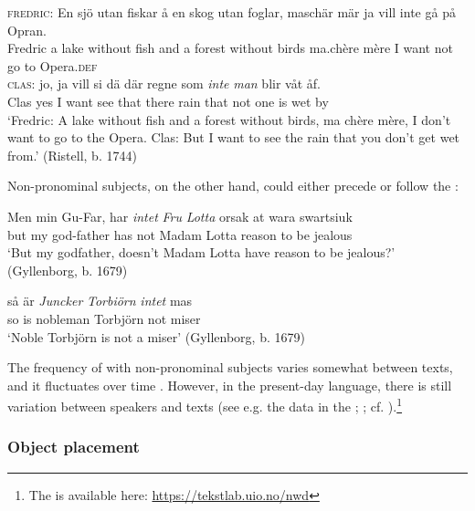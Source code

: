 \documentclass[output=paper]{langscibook}
\begin{document}
\ex\label{ex:intro:14b}
\gll \textsc{fredric}: En   sjö   utan     fiskar å     en skog     utan     foglar, maschär   mär ja   vill   inte  gå   på Opran.\\
    Fredric  a     lake   without   fish   and   a   forest   without   birds ma.chère   mère I   want not  go   to Opera\textsc{.def}\\

\gll \textsc{clas}: jo,   ja   vill   si     dä   där   regne   som \textit{inte} \textit{man} blir   våt   åf. \\
    Clas yes   I   want   see   that   there   rain     that   not   one   is     wet   by\\

\glt `Fredric: A lake without fish and a forest without birds, ma chère mère, I don’t want to go to the Opera. Clas: But I want to see the rain that you don’t get wet from.’ (Ristell, b. 1744)
\z
\z

Non-pronominal subjects, on the other hand, could either precede or follow the :


\ea
\ea
\gll  Men   min Gu-Far,       har \textit{intet} \textit{Fru} \textit{Lotta} orsak   at   wara swartsiuk \\
but   my   god-father   has   not   Madam Lotta reason to be   jealous\\

\glt ‘But my godfather, doesn’t Madam Lotta have reason to be jealous?’ (Gyllenborg, b. 1679)

\ex
\gll  så   är \textit{Juncker} \textit{Torbiörn} \textit{intet} mas \\
    so is    nobleman    Torbjörn  not    miser\\
    \glt ‘Noble Torbjörn is not a miser’ (Gyllenborg, b. 1679)
\z
\z


The frequency of  with non-pronominal subjects varies somewhat between texts, and it fluctuates over time \citep{LarssonLundquist2021}. However, in the present-day language, there is still variation between speakers and texts (see e.g. the data in the ; \citealt{LundquistEtAl2019}; cf. \citealt{Andreasson2007}).\footnote{The  is available here: \url{https://tekstlab.uio.no/nwd}} 


\subsubsection{Object placement}\label{sec:intro:3.2.2}
\end{document}

